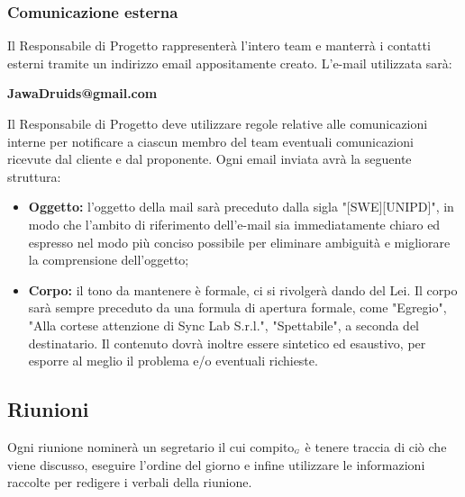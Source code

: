 \subsubsection{Comunicazione esterna}\label{ProcessiOrganizzativiProcessoDiCoordinamentoComunicazioneEsterna}
Il Responsabile di Progetto rappresenterà l'intero team e manterrà i contatti esterni tramite un indirizzo email appositamente creato.
L'e-mail utilizzata sarà: 
\begin{center}
	\textbf {JawaDruids@gmail.com}
\end{center}
Il Responsabile di Progetto deve utilizzare regole relative alle comunicazioni interne per notificare a ciascun membro del team eventuali comunicazioni ricevute dal cliente e dal proponente.
Ogni email inviata avrà la seguente struttura:
\begin{itemize}
\item \textbf{Oggetto:} l'oggetto della mail sarà preceduto dalla sigla "[SWE][UNIPD]", in modo che l'ambito di riferimento dell'e-mail sia immediatamente chiaro ed espresso nel modo più conciso possibile per eliminare ambiguità e migliorare la comprensione dell'oggetto;
	\item \textbf{Corpo:} il tono da mantenere è formale, ci si rivolgerà dando del Lei. Il corpo sarà sempre preceduto da una formula di apertura formale, come "Egregio", "Alla cortese attenzione di Sync Lab S.r.l.", "Spettabile", a seconda del destinatario.
	Il contenuto dovrà inoltre essere sintetico ed esaustivo, per esporre al meglio il problema e/o eventuali richieste.
\end{itemize}
\subsection{Riunioni}\label{ProcessiOrganizzativiProcessoDiCoordinamentoRiunioni}
Ogni riunione nominerà un segretario il cui compito$_{\scaleto{G}{3pt}}$ è tenere traccia di ciò che viene discusso, eseguire l'ordine del giorno e infine utilizzare le informazioni raccolte per redigere i verbali della riunione.

